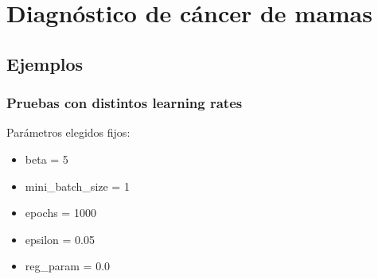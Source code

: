 \section{Diagnóstico de cáncer de mamas}

\subsection{Ejemplos}

\subsubsection{Pruebas con distintos learning rates}

Parámetros elegidos fijos:

\begin{itemize}
\item beta = 5
\item mini\_batch\_size = 1
\item epochs = 1000
\item epsilon = 0.05
\item reg\_param = 0.0
\end{itemize}



